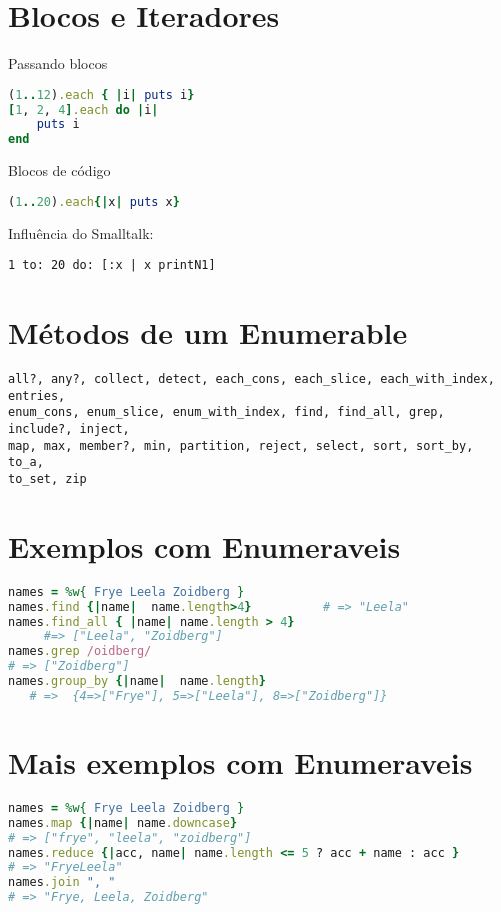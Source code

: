 \documentclass[serif,mathserif]{book}
\begin{document}
\section{Blocos e Iteradores}

Passando blocos
\begin{lstlisting}[language=ruby]
(1..12).each { |i| puts i}
[1, 2, 4].each do |i|
    puts i
end
\end{lstlisting}

Blocos de código
\begin{lstlisting}[language=ruby]
(1..20).each{|x| puts x}
\end{lstlisting}

Influência do Smalltalk:
\begin{lstlisting}[language=smalltalk]
   1 to: 20 do: [:x | x printN1]
\end{lstlisting}

\section{ Métodos de um Enumerable}
\begin{lstlisting}  
all?, any?, collect, detect, each_cons, each_slice, each_with_index, entries,
enum_cons, enum_slice, enum_with_index, find, find_all, grep, include?, inject,
map, max, member?, min, partition, reject, select, sort, sort_by, to_a,
to_set, zip
\end{lstlisting}
 
\section{Exemplos com Enumeraveis}
\begin{lstlisting}[language=ruby]
names = %w{ Frye Leela Zoidberg }
names.find {|name|  name.length>4}          # => "Leela"
names.find_all { |name| name.length > 4}
     #=> ["Leela", "Zoidberg"]
names.grep /oidberg/
# => ["Zoidberg"]
names.group_by {|name|  name.length}
   # =>  {4=>["Frye"], 5=>["Leela"], 8=>["Zoidberg"]}
\end{lstlisting}

\section{Mais exemplos com Enumeraveis}
\begin{lstlisting}[language=ruby]
names = %w{ Frye Leela Zoidberg }
names.map {|name| name.downcase}
# => ["frye", "leela", "zoidberg"]
names.reduce {|acc, name| name.length <= 5 ? acc + name : acc }
# => "FryeLeela"
names.join ", "
# => "Frye, Leela, Zoidberg"
\end{lstlisting}
\end{document}
